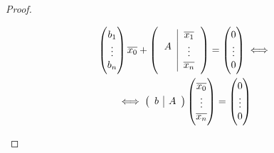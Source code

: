 \begin{proof}
\begin{enumerate}[i)]
\begin{gather*}
\begin{pmatrix}
     b_1 \\ \vdots \\ b_n
   \end{pmatrix}
   \overline{x_0}
   +
   \lp
   \begin{tabular}{c|c} 
     \multirow{3}{*}{$A$} & $\overline{x_1}$\\ 
     & $\vdots$  \\ & $ \overline{x_n}$
    \end{tabular} 
    \rp
    =
    \begin{pmatrix}
     0 \\ \vdots \\ 0
   \end{pmatrix}
   \iff \\
   \iff
   \lp
         \begin{array}{c|c} 
           b & A 
         \end{array}
         \rp
         \begin{pmatrix}
           \overline{x_0} \\
           \vdots \\
           \overline{x_n}
         \end{pmatrix}
 = 
 \begin{pmatrix}
   0 \\ \vdots \\ 0
 \end{pmatrix}
\end{gather*} 
        
   \end{enumerate}

 \end{proof}
 
